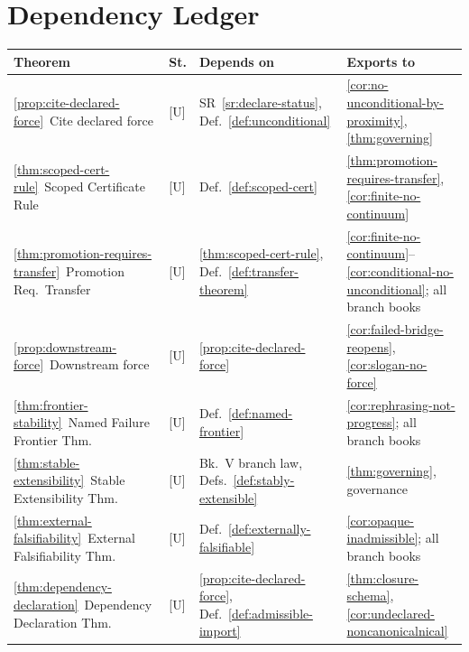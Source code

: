 \documentclass[12pt,oneside]{amsbook}
\theoremstyle{plain}
\theoremstyle{definition}
\theoremstyle{remark}
\begin{document}
\section{Dependency Ledger}

\renewcommand{\arraystretch}{1.4}
\noindent
\small
\begin{tabular}{@{}p{4.4cm}p{0.8cm}p{3.0cm}p{4.8cm}@{}}
\hline
\textbf{Theorem} & \textbf{St.} & \textbf{Depends on} & \textbf{Exports to} \\
\hline
\ref{prop:cite-declared-force}\ Cite declared force
  & [U] & SR~\ref{sr:declare-status}, Def.~\ref{def:unconditional}
  & \ref{cor:no-unconditional-by-proximity}, \ref{thm:governing} \\

\ref{thm:scoped-cert-rule}\ Scoped Certificate Rule
  & [U] & Def.~\ref{def:scoped-cert}
  & \ref{thm:promotion-requires-transfer}, \ref{cor:finite-no-continuum} \\

\ref{thm:promotion-requires-transfer}\ Promotion Req.\ Transfer
  & [U] & \ref{thm:scoped-cert-rule}, Def.~\ref{def:transfer-theorem}
  & \ref{cor:finite-no-continuum}--\ref{cor:conditional-no-unconditional};
    all branch books \\

\ref{prop:downstream-force}\ Downstream force
  & [U] & \ref{prop:cite-declared-force}
  & \ref{cor:failed-bridge-reopens}, \ref{cor:slogan-no-force} \\

\ref{thm:frontier-stability}\ Named Failure Frontier Thm.
  & [U] & Def.~\ref{def:named-frontier}
  & \ref{cor:rephrasing-not-progress}; all branch books \\

\ref{thm:stable-extensibility}\ Stable Extensibility Thm.
  & [U] & Bk.~V branch law, Defs.~\ref{def:stably-extensible}
  & \ref{thm:governing}, governance \\

\ref{thm:external-falsifiability}\ External Falsifiability Thm.
  & [U] & Def.~\ref{def:externally-falsifiable}
  & \ref{cor:opaque-inadmissible}; all branch books \\

\ref{thm:dependency-declaration}\ Dependency Declaration Thm.
  & [U] & \ref{prop:cite-declared-force},
    Def.~\ref{def:admissible-import}
  & \ref{thm:closure-schema}, \ref{cor:undeclared-noncanonicalnical} \\


\end{tabular}
\end{document}
